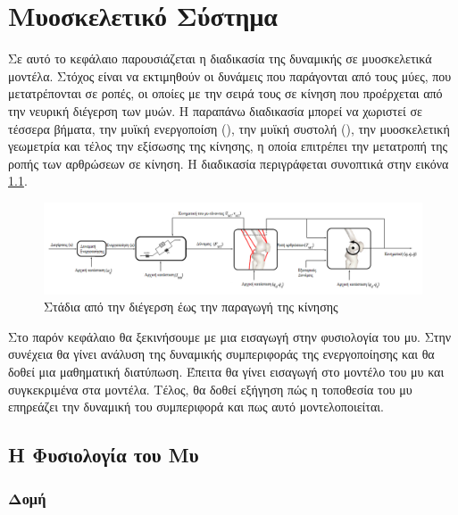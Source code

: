 \chapter{Μυοσκελετικό Σύστημα}

Σε αυτό το κεφάλαιο παρουσιάζεται η διαδικασία της δυναμικής σε μυοσκελετικά μοντέλα. Στόχος είναι να εκτιμηθούν οι δυνάμεις που παράγονται από τους μύες, που μετατρέπονται σε  ροπές, οι οποίες με την σειρά τους σε κίνηση που προέρχεται από την νευρική διέγερση των μυών. Η παραπάνω διαδικασία μπορεί να χωριστεί σε τέσσερα βήματα, την μυϊκή ενεργοποίση (), την μυϊκή συστολή (), την μυοσκελετική γεωμετρία και τέλος την εξίσωσης της κίνησης, η οποία επιτρέπει την μετατροπή της ροπής των αρθρώσεων σε κίνηση. Η διαδικασία περιγράφεται συνοπτικά στην εικόνα \ref{fig:muscle-excitation-force}.

\begin{figure}[H]
    \centering
    \includegraphics[width=1.0\textwidth, keepaspectratio]{fig/muscle-excitation-force.png}
    \caption{Στάδια από την διέγερση έως την παραγωγή της κίνησης \cite{erdemir07}}
    \label{fig:muscle-excitation-force}
\end{figure}

Στο παρόν κεφάλαιο θα ξεκινήσουμε με μια εισαγωγή στην φυσιολογία του μυ. Στην συνέχεια θα γίνει ανάλυση της δυναμικής συμπεριφοράς της ενεργοποίησης και θα δοθεί μια μαθηματική διατύπωση. Έπειτα θα γίνει εισαγωγή στο μοντέλο του μυ και συγκεκριμένα στα  μοντέλα. Τέλος, θα δοθεί εξήγηση πώς η τοποθεσία του μυ επηρεάζει την δυναμική του συμπεριφορά και πως αυτό μοντελοποιείται.

\section{H Φυσιολογία του Μυ}

\subsection{Δομή}

